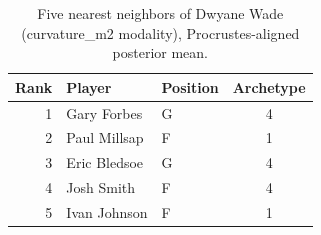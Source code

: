 \begin{table}[htbp]
  \centering\small
  \begin{tabular}{rllc}
    \toprule
    Rank & Player & Position & Archetype \\
    \midrule
    1 & Gary Forbes & G & 4 \\
    2 & Paul Millsap & F & 1 \\
    3 & Eric Bledsoe & G & 4 \\
    4 & Josh Smith & F & 4 \\
    5 & Ivan Johnson & F & 1 \\
    \bottomrule
  \end{tabular}
  \caption{Five nearest neighbors of Dwyane Wade (curvature_m2 modality), Procrustes-aligned posterior mean.}
  \label{tab:Dwyane_Wade_neighbors_curvature_m2}
\end{table}

